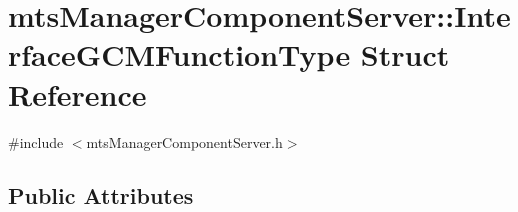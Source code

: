 \hypertarget{structmts_manager_component_server_1_1_interface_g_c_m_function_type}{\section{mts\-Manager\-Component\-Server\-:\-:Interface\-G\-C\-M\-Function\-Type Struct Reference}
\label{structmts_manager_component_server_1_1_interface_g_c_m_function_type}
}


{\ttfamily \#include $<$mts\-Manager\-Component\-Server.\-h$>$}

\subsection*{Public Attributes}
